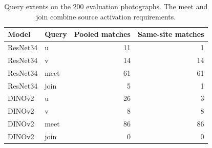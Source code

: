 \begin{table}[tbp]
    \centering
    \begin{tabular}{llrr}
        \toprule
        Model    & Query & Pooled matches & Same-site matches \\
        \midrule
        ResNet34 & u     & 11             & 1                 \\
        ResNet34 & v     & 14             & 14                \\
        ResNet34 & meet  & 61             & 61                \\
        ResNet34 & join  & 5              & 1                 \\
        DINOv2   & u     & 26             & 3                 \\
        DINOv2   & v     & 8              & 8                 \\
        DINOv2   & meet  & 86             & 86                \\
        DINOv2   & join  & 0              & 0                 \\
        \bottomrule
    \end{tabular}
    \caption{Query extents on the 200 evaluation photographs. The meet and join
        combine source activation requirements.}
    \label{tab:imagenette-queries}
\end{table}
